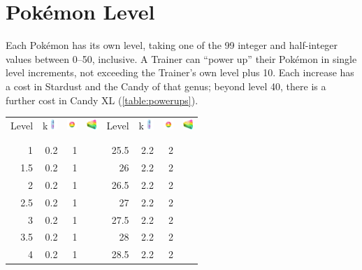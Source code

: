 \section{Pokémon Level}
\label{sec:plevel}
Each Pokémon has its own level, taking one of the 99 integer and half-integer
 values between 0--50, inclusive.
A Trainer can ``power up'' their Pokémon in single level increments,
 not exceeding the Trainer's own level plus 10.
Each increase has a cost in Stardust and the Candy of that genus; beyond level 40, there
  is a further cost in Candy XL (\autoref{table:powerups}).
\begin{table}
  \footnotesize
  \begin{center}
    \begin{tabular}[ht]{rrrr|rrrr}
      Level &
        k\includegraphics[width=1em,height=1em]{images/stardust.png} &
        \includegraphics[width=1em,height=1em]{images/rarecandy.png} &
        \includegraphics[width=1em,height=1em]{images/rarecandyxl.png} &
      Level &
        k\includegraphics[width=1em,height=1em]{images/stardust.png} &
        \includegraphics[width=1em,height=1em]{images/rarecandy.png} &
        \includegraphics[width=1em,height=1em]{images/rarecandyxl.png} \\
      \Midrule\\\\
        1 & 0.2 & 1 & & 25.5 & 2.2 & 2 & \\
      1.5 & 0.2 & 1 & & 26 & 2.2 & 2 & \\
        2 & 0.2 & 1 & & 26.5 & 2.2 & 2 & \\
      2.5 & 0.2 & 1 & & 27 & 2.2 & 2 & \\
        3 & 0.2 & 1 & & 27.5 & 2.2 & 2 & \\
      3.5 & 0.2 & 1 & & 28 & 2.2 & 2 & \\
        4 & 0.2 & 1 & & 28.5 & 2.2 & 2 & \\

\end{tabular}
\end{center}
\end{table}
